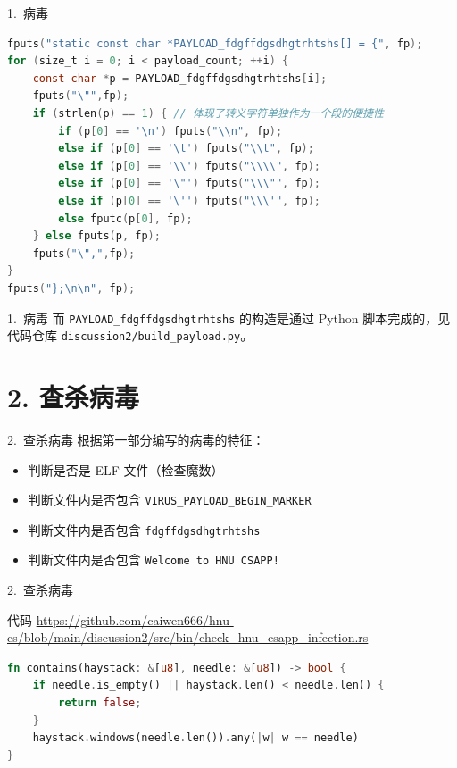 \documentclass{beamer}
\begin{document}
\begin{frame}[fragile]{1.\ 病毒}
  \begin{lstlisting}[language=C,basicstyle=\ttfamily\tiny]
fputs("static const char *PAYLOAD_fdgffdgsdhgtrhtshs[] = {", fp);
for (size_t i = 0; i < payload_count; ++i) {
    const char *p = PAYLOAD_fdgffdgsdhgtrhtshs[i];
    fputs("\"",fp);
    if (strlen(p) == 1) { // 体现了转义字符单独作为一个段的便捷性
        if (p[0] == '\n') fputs("\\n", fp);
        else if (p[0] == '\t') fputs("\\t", fp);
        else if (p[0] == '\\') fputs("\\\\", fp);
        else if (p[0] == '\"') fputs("\\\"", fp);
        else if (p[0] == '\'') fputs("\\\'", fp);
        else fputc(p[0], fp);
    } else fputs(p, fp);
    fputs("\",",fp);
}
fputs("};\n\n", fp);
  \end{lstlisting}
\end{frame}

\begin{frame}{1.\ 病毒}
  而 \texttt{PAYLOAD\_fdgffdgsdhgtrhtshs} 的构造是通过 Python 脚本完成的，见代码仓库 \texttt{discussion2/build\_payload.py}。
\end{frame}

\section{2. 查杀病毒}

\begin{frame}{2.\ 查杀病毒}
  根据第一部分编写的病毒的特征：
  \begin{itemize}[<+->]
    \item 判断是否是 ELF 文件（检查魔数）
    \item 判断文件内是否包含 \texttt{VIRUS\_PAYLOAD\_BEGIN\_MARKER}
    \item 判断文件内是否包含 \texttt{fdgffdgsdhgtrhtshs}
    \item 判断文件内是否包含 \texttt{Welcome to HNU CSAPP!}
  \end{itemize}
\end{frame}

\begin{frame}[fragile]{2.\ 查杀病毒}
  \begin{block}{代码}
    \url{https://github.com/caiwen666/hnu-cs/blob/main/discussion2/src/bin/check_hnu_csapp_infection.rs}
  \end{block}
  \pause
  \begin{lstlisting}[language=Rust]
fn contains(haystack: &[u8], needle: &[u8]) -> bool {
    if needle.is_empty() || haystack.len() < needle.len() {
        return false;
    }
    haystack.windows(needle.len()).any(|w| w == needle)
}
  \end{lstlisting}
\end{frame}
\end{document}
